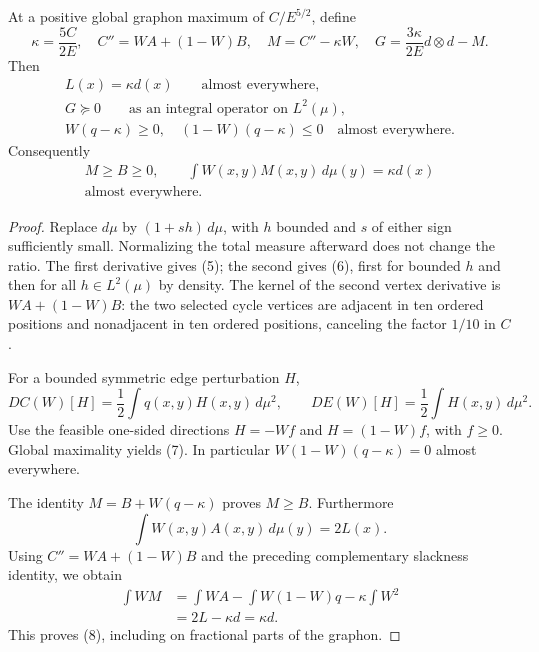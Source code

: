 \begin{lemma}\label{lem:variations}
At a positive global graphon maximum of \(C/E^{5/2}\), define
\[
 \kappa=\frac{5C}{2E},\quad C''=WA+(1-W)B,\quad
 M=C''-\kappa W,\quad G=\frac{3\kappa}{2E}d\otimes d-M.
\]
Then
\begin{gather}
 L(x)=\kappa d(x)\qquad\text{almost everywhere},\tag{5}\\
 G\succeq0\qquad\text{as an integral operator on \(L^2(\mu)\)},\tag{6}\\
 W(q-\kappa)\ge0,\quad (1-W)(q-\kappa)\le0
       \quad\text{almost everywhere}.\tag{7}
\end{gather}
Consequently
\begin{equation}
 \begin{gathered}
 M\ge B\ge0,\qquad
 \int W(x,y)M(x,y)\,d\mu(y)=\kappa d(x)\\
 \text{almost everywhere}.
 \end{gathered}\tag{8}
\end{equation}
\end{lemma}
\begin{proof}
Replace \(d\mu\) by \((1+sh)\,d\mu\), with \(h\) bounded and \(s\) of
either sign sufficiently small. Normalizing the total measure afterward
does not change the ratio. The first derivative gives (5); the second gives
(6), first for bounded \(h\) and then for all \(h\in L^2(\mu)\) by density.
The kernel of the second vertex derivative is \(WA+(1-W)B\): the two
selected cycle vertices are adjacent in ten ordered positions and
nonadjacent in ten ordered positions, canceling the factor \(1/10\) in
\(C\).

For a bounded symmetric edge perturbation \(H\),
\[
 DC(W)[H]=\frac12\int q(x,y)H(x,y)\,d\mu^2,\qquad
 DE(W)[H]=\frac12\int H(x,y)\,d\mu^2.
\]
Use the feasible one-sided directions \(H=-Wf\) and \(H=(1-W)f\), with
\(f\ge0\). Global maximality yields (7). In particular
\(W(1-W)(q-\kappa)=0\) almost everywhere.

The identity \(M=B+W(q-\kappa)\) proves \(M\ge B\). Furthermore
\[
 \int W(x,y)A(x,y)\,d\mu(y)=2L(x).
\]
Using \(C''=WA+(1-W)B\) and the preceding complementary slackness
identity, we obtain
\begin{align*}
 \int WM
 &=\int WA-\int W(1-W)q-\kappa\int W^2\\
 &=2L-\kappa d=\kappa d.
\end{align*}
This proves (8), including on fractional parts of the graphon.
\end{proof}

